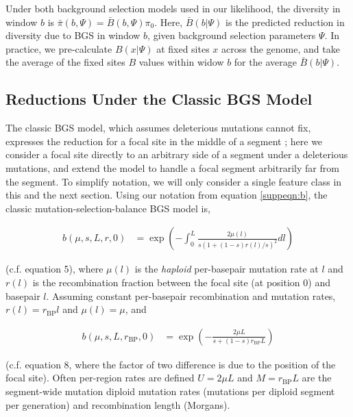 \documentclass[11pt]{article}
\begin{document}
Under both background selection models used in our likelihood, the diversity in
window $b$ is $\bar{\pi}(b, \Psi) = \bar{B}(b, \Psi) \pi_0$. Here, $\bar{B}(b |
\Psi)$ is the predicted reduction in diversity due to BGS in window $b$, given
background selection parameters $\Psi$. In practice, we pre-calculate $B(x |
\Psi)$ at fixed sites $x$ across the genome, and take the average of the fixed
sites $B$ values within widow $b$ for the average $\bar{B}(b | \Psi)$. 

\subsection{Reductions Under the Classic BGS Model}

The classic BGS model, which assumes deleterious mutations cannot fix,
expresses the reduction for a focal site in the middle of a segment
\parencite{Hudson1995-xc,Hudson1994-oh,Nordborg1996-nq}; here we consider a
focal site directly to an arbitrary side of a segment under a deleterious
mutations, and extend the model to handle a focal segment arbitrarily far from
the segment. To simplify notation, we will only consider a single feature class
in this and the next section. Using our notation from equation
\eqref{suppeqn:b}, the classic mutation-selection-balance BGS model is,

\begin{align}
  b(\mu, s, L, r, 0) &= \exp \left( - \int_0^L \frac{2\mu(l)}{s (1 + (1-s) r(l)/s)^2} dl \right) 
\end{align}

(c.f. \cite{Hudson1995-xc} equation 5), where $\mu(l)$ is the \emph{haploid}
per-basepair mutation rate at $l$ and $r(l)$ is the recombination fraction
between the focal site (at position 0) and basepair $l$. Assuming constant
per-basepair recombination and mutation rates, $r(l) = r_\text{BP}l$ and
$\mu(l) = \mu$, and

\begin{align}
  b(\mu, s, L, r_\text{BP}, 0) &= \exp \left( - \frac{2\mu L}{s + (1-s) r_\text{BP} L} \right)
\end{align}

(c.f. \cite{Hudson1995-xc} equation 8, where the factor of two difference is
due to the position of the focal site). Often per-region rates are defined $U =
2 \mu L$ and $M = r_\text{BP} L$ are the segment-wide mutation diploid mutation
rates (mutations per diploid segment per generation) and recombination length
(Morgans). 
\end{document}
